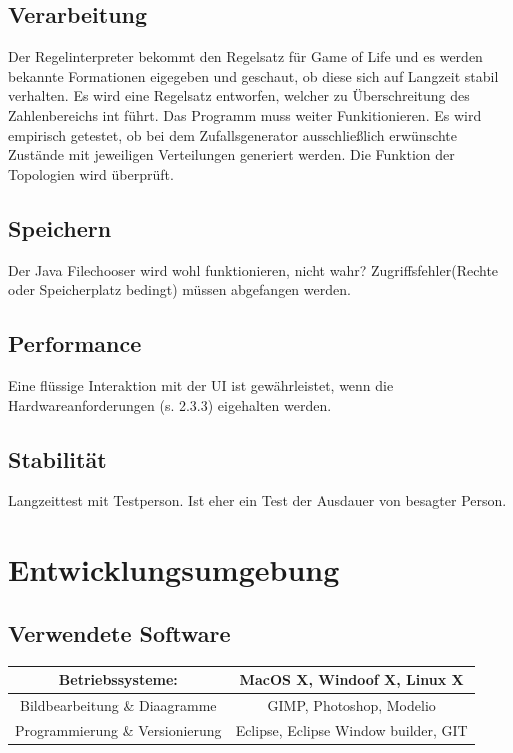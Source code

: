 \documentclass[11pt,a4paper]{article}
\begin{document}
\subsection{Verarbeitung}
Der Regelinterpreter bekommt den Regelsatz für Game of Life und es werden bekannte Formationen eigegeben und geschaut, ob diese sich auf Langzeit stabil verhalten. 
Es wird eine Regelsatz entworfen, welcher zu Überschreitung des Zahlenbereichs int führt. Das Programm muss weiter Funkitionieren.
Es wird empirisch getestet, ob bei dem Zufallsgenerator ausschließlich erwünschte Zustände mit jeweiligen Verteilungen generiert werden.
Die Funktion der Topologien wird überprüft.



\subsection{Speichern}
Der Java Filechooser wird wohl funktionieren, nicht wahr?
Zugriffsfehler(Rechte oder Speicherplatz bedingt) müssen abgefangen werden.


\subsection{Performance}
Eine flüssige Interaktion mit der UI ist gewährleistet, wenn die Hardwareanforderungen (s. 2.3.3) eigehalten werden.

\subsection {Stabilität}
Langzeittest mit Testperson.
Ist eher ein Test der Ausdauer von besagter Person.
\section{Entwicklungsumgebung}
\subsection{Verwendete Software}
\begin{tabular}{|c|c|}
\hline
Betriebssysteme:     &  MacOS X, Windoof X, Linux X
  \\
     \hline
     Bildbearbeitung  \&  Diaagramme & 
         GIMP, Photoshop, Modelio
 \\
     \hline
     Programmierung  \& Versionierung & 
          Eclipse, 
          Eclipse Window builder,
          GIT\\
     \hline
\end{tabular}
\end{document}
